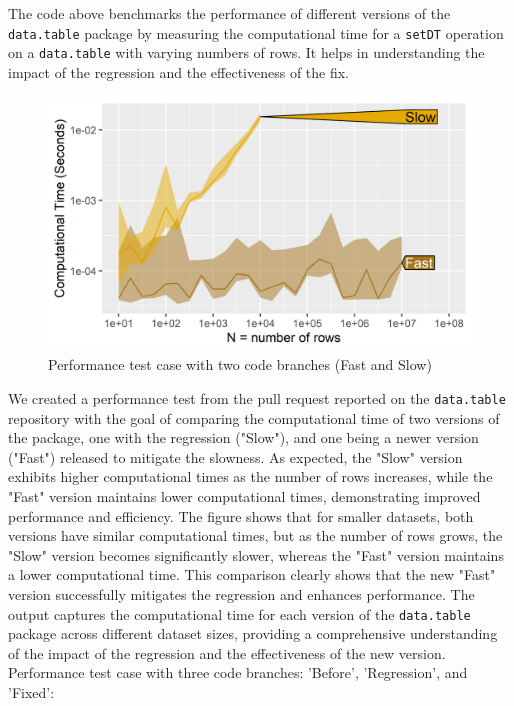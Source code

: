 \noindent The code above benchmarks the performance of different versions of the \texttt{data.table} package by measuring the computational time for a \texttt{setDT} operation on a \texttt{data.table} with varying numbers of rows. It helps in understanding the impact of the regression and the effectiveness of the fix. \\

\begin{figure}[H]
    \centering
    \includegraphics[width=0.6\linewidth]{figures/atime.list.5427.png}
    \caption{Performance test case with two code branches (Fast and Slow)}
    \label{fig:label3}
\end{figure}

\noindent We created a performance test from the pull request reported on the \texttt{data.table} repository with the goal of comparing the computational time of two versions of the package, one with the regression ("Slow"), and one being a newer version ("Fast") released to mitigate the slowness. As expected, the "Slow" version exhibits higher computational times as the number of rows increases, while the "Fast" version maintains lower computational times, demonstrating improved performance and efficiency. The figure shows that for smaller datasets, both versions have similar computational times, but as the number of rows grows, the "Slow" version becomes significantly slower, whereas the "Fast" version maintains a lower computational time. This comparison clearly shows that the new "Fast" version successfully mitigates the regression and enhances performance. The output captures the computational time for each version of the \texttt{data.table} package across different dataset sizes, providing a comprehensive understanding of the impact of the regression and the effectiveness of the new version.\\

\noindent Performance test case with three code branches: 'Before', 'Regression', and 'Fixed': \\

